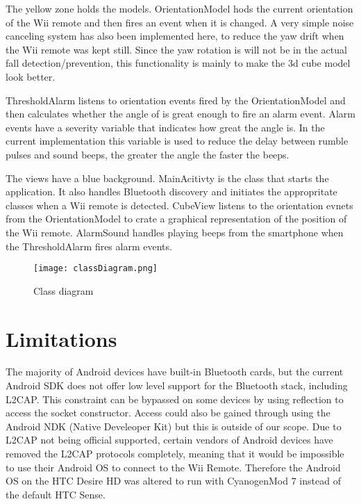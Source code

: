 The yellow zone holds the models. OrientationModel hods the current orientation of the Wii remote and then fires an event when it is changed. A very simple noise canceling system has also been implemented here, to reduce the yaw drift when the Wii remote was kept still. Since the yaw rotation is will not be in the actual fall detection/prevention, this functionality is mainly to make the 3d cube model look better.

ThresholdAlarm listens to orientation events fired by the OrientationModel and then calculates whether the angle of is great enough to fire an alarm event. Alarm events have a severity variable that indicates how great the angle is. In the current implementation this variable is used to reduce the delay between rumble pulses and sound beeps, the greater the angle the faster the beeps.

The views have a blue background. MainAcitivty is the class that starts the application. It also handles Bluetooth discovery and initiates the appropritate classes when a Wii remote is detected. CubeView listens to the orientation evnets from the OrientationModel to crate a graphical representation of the position of the Wii remote. AlarmSound handles playing beeps from the smartphone when the ThresholdAlarm fires alarm events. 

\begin{figure}[h!]
	\centering
	\texttt{[image: classDiagram.png]}
	\caption{\footnotesize Class diagram}
	\label{fig:classDiagram}
\end{figure}

\section{Limitations}
The majority of Android devices have built-in Bluetooth cards, but the current Android SDK does not offer low level support for the Bluetooth stack, including L2CAP. This constraint can be bypassed on some devices by using reflection to access the socket constructor\cite{l2capHtc}. Access could also be gained through using the Android NDK (Native Develeoper Kit) but this is outside of our scope. Due to L2CAP not being official supported, certain vendors of Android devices have removed the L2CAP protocols completely, meaning that it would be impossible to use their Android OS to connect to the Wii Remote. Therefore the Android OS on the HTC Desire HD was altered to run with CyanogenMod 7 instead of the default HTC Sense.

